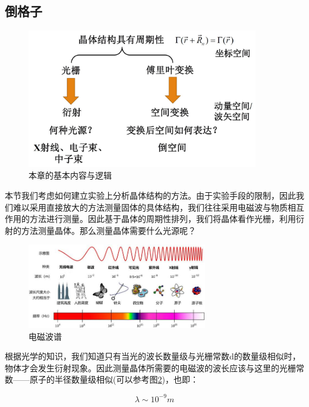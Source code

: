 \documentclass{ctexart}
\begin{document}
    \subsection{倒格子}
    \begin{figure}[H]
        \centering
        \includegraphics[width=0.9\textwidth]{figure/倒格子与布里渊区提纲.jpg}
        \caption{本章的基本内容与逻辑}
        \label{fig:CH3Index}
    \end{figure}
    
    本节我们考虑如何建立实验上分析晶体结构的方法。由于实验手段的限制，因此我们难以采用直接放大的方法测量固体的具体结构，我们往往采用电磁波与物质相互作用的方法进行测量。因此基于晶体的周期性排列，我们将晶体看作光栅，利用衍射的方法测量晶体。那么测量晶体需要什么光源呢？
    \begin{figure}[H]
        \centering
        \includegraphics[width=0.7\textwidth]{figure/电磁波谱.jpeg}
        \caption{电磁波谱}
        \label{fig:electromagneticspectrum}
    \end{figure}
    
    根据光学的知识，我们知道只有当光的波长数量级与光栅常数d的数量级相似时，物体才会发生衍射现象。因此测量晶体所需要的电磁波的波长应该与这里的光栅常数——原子的半径数量级相似(可以参考图\ref{fig:electromagneticspectrum})，也即：
    
    \begin{equation}
        \lambda\sim 10^{-9}m
    \end{equation}
    
\end{document}
